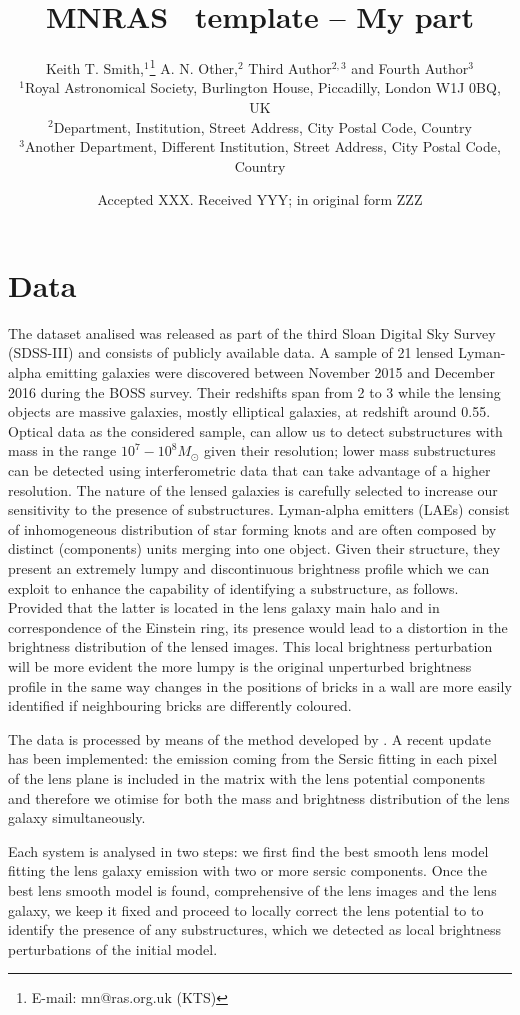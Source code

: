 \documentclass[a4paper,fleqn,usenatbib]{mnras}
\title[Short title, max. 45 characters]{MNRAS \LaTeXe\ template -- My part}
\author[K. T. Smith et al.]{
Keith T. Smith,$^{1}$\thanks{E-mail: mn@ras.org.uk (KTS)}
A. N. Other,$^{2}$
Third Author$^{2,3}$
and Fourth Author$^{3}$
\\
$^{1}$Royal Astronomical Society, Burlington House, Piccadilly, London W1J 0BQ, UK\\
$^{2}$Department, Institution, Street Address, City Postal Code, Country\\
$^{3}$Another Department, Different Institution, Street Address, City Postal Code, Country
}
\date{Accepted XXX. Received YYY; in original form ZZZ}
\begin{document}
\label{firstpage}
\pagerange{\pageref{firstpage}--\pageref{lastpage}}
\maketitle


\section{Data}
The dataset analised was released as part of the third Sloan Digital Sky Survey (SDSS-III) and consists of publicly available data. A sample of 21 lensed Lyman-alpha emitting galaxies were discovered between November 2015 and December 2016 during the BOSS survey. Their redshifts span from 2 to 3 while the lensing objects are massive galaxies, mostly elliptical galaxies, at redshift around 0.55.
Optical data as the considered sample, can allow us to detect substructures with mass in the range $10^7 - 10^8 M_{\odot}$ given their resolution; lower mass substructures can be detected using interferometric data that can take advantage of a higher resolution.
The nature of the lensed galaxies is carefully selected to increase our sensitivity to the presence of substructures. Lyman-alpha emitters (LAEs) consist of inhomogeneous distribution of star forming knots and are often composed by distinct (components) units merging into one object. Given their structure, they present an extremely lumpy and discontinuous brightness profile which we can exploit to enhance the capability of identifying a substructure, as follows. Provided that the latter is located in the lens galaxy main halo and in correspondence of the Einstein ring, its presence would lead to a distortion in the brightness distribution of the lensed images. This local brightness perturbation will be more evident the more lumpy is the original unperturbed brightness profile in the same way changes in the positions of bricks in a wall are more easily identified if neighbouring bricks are differently coloured.

The data is processed by means of the method developed by \citet{method}. A recent update has been implemented: the emission coming from the Sersic fitting in each pixel of the lens plane is included in the matrix with the lens potential components and therefore we otimise for both the mass and brightness distribution of the lens galaxy simultaneously.

Each system is analysed in two steps: we first find the best smooth lens model fitting the lens galaxy emission with two or more sersic components. Once the best lens smooth model is found, comprehensive of the lens images and the lens galaxy, we keep it fixed and proceed to locally correct the lens potential to to identify the presence of any substructures, which we detected as local brightness perturbations of the initial model.
\end{document}
